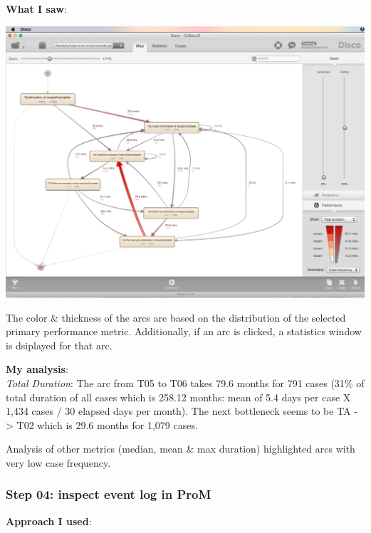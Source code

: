 \documentclass[]{article}
\begin{document}
\textbf{What I saw}:

\includegraphics{CoSeLoG_Step_03.png}

The color \& thickness of the arcs are based on the distribution of the
selected primary performance metric. Additionally, if an arc is clicked,
a statistics window is dsiplayed for that arc.

\textbf{My analysis}:\\\emph{Total Duration}: The arc from T05 to T06
takes 79.6 months for 791 cases (31\% of total duration of all cases
which is 258.12 months: mean of 5.4 days per case X 1,434 cases / 30
elapsed days per month). The next bottleneck seems to be TA
-\textgreater{} T02 which is 29.6 months for 1,079 cases.

Analysis of other metrics (median, mean \& max duration) highlighted
arcs with very low case frequency.

\subsubsection{Step 04: inspect event log in
ProM}\label{step-04-inspect-event-log-in-prom}

\textbf{Approach I used}:
\end{document}
